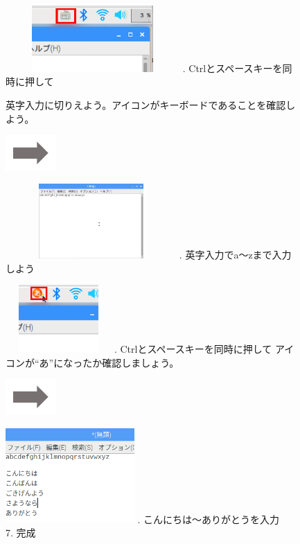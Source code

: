 \documentclass[a4paper,12pt]{jarticle}
\begin{document}
\begin{figure}[ht]
  \begin{minipage}{7.238cm}
    \includegraphics[width=6.643cm,height=2.533cm]{textbook-img059.png}
    . Ctrlとスペースキーを同時に押して

    英字入力に切りえよう。アイコンがキーボードであることを確認しよう。
  \end{minipage}
  \includegraphics[width=1.919cm,height=1.365cm]{textbook-img053.png}
  \begin{minipage}{7.351cm}
    \includegraphics[width=6.514cm,height=2.856cm]{textbook-img061.png}
    . 英字入力でa〜zまで入力しよう
  \end{minipage}

  \begin{minipage}{6.73cm}
    \includegraphics[width=4.029cm,height=2.586cm]{textbook-img062.png}
    . Ctrlとスペースキーを同時に押して
    アイコンが“あ”になったか確認しましょう。
  \end{minipage}
  \includegraphics[width=1.919cm,height=1.365cm]{textbook-img053.png}
  \begin{minipage}{6.589cm}
    \includegraphics[width=4.914cm,height=3.616cm]{textbook-img060.png}
    . こんにちは〜ありがとうを入力\\
    7. 完成
  \end{minipage}




\end{figure}
\end{document}
